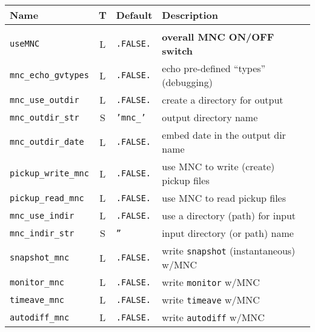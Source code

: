 \begin{center}
  {\footnotesize
    \begin{tabular}[htb]{|l|c|l|l|}\hline
      \textbf{Name}  &  \textbf{T}  &  
      \textbf{Default}  &  \textbf{Description}  \\\hline
      &  &  &  \\
      \texttt{useMNC}  &  L  & \texttt{.FALSE.}  &  
      \textbf{overall MNC ON/OFF switch}  \\
      \texttt{mnc\_echo\_gvtypes}  &  L  & \texttt{.FALSE.}  &  
      echo pre-defined ``types'' (debugging)   \\
      \texttt{mnc\_use\_outdir}  &  L  & \texttt{.FALSE.}  &  
      create a directory for output  \\
      \texttt{mnc\_outdir\_str}  &  S  & \texttt{'mnc\_'}  &  
      output directory name \\
      \texttt{mnc\_outdir\_date}  &  L  & \texttt{.FALSE.}  &  
      embed date in the output dir name  \\
      \texttt{pickup\_write\_mnc}  &  L  & \texttt{.FALSE.}  &  
      use MNC to write (create) pickup files  \\
      \texttt{pickup\_read\_mnc}  &  L  & \texttt{.FALSE.}  &  
      use MNC to read pickup files  \\
      \texttt{mnc\_use\_indir}  &  L  & \texttt{.FALSE.}  &  
      use a directory (path) for input  \\
      \texttt{mnc\_indir\_str}  &  S  & \texttt{''}  &  
      input directory (or path) name  \\
      \texttt{snapshot\_mnc}  &  L  & \texttt{.FALSE.}  &  
      write \texttt{snapshot} (instantaneous) w/MNC  \\
      \texttt{monitor\_mnc}  &  L  & \texttt{.FALSE.}  &  
      write \texttt{monitor} w/MNC  \\
      \texttt{timeave\_mnc}  &  L  & \texttt{.FALSE.}  &  
      write \texttt{timeave} w/MNC  \\
      \texttt{autodiff\_mnc}  &  L  & \texttt{.FALSE.}  &  
      write \texttt{autodiff} w/MNC  \\\hline
    \end{tabular}
  }
\end{center}

